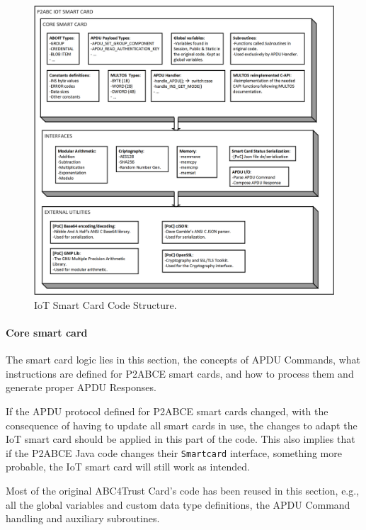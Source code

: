 \begin{figure}[bth]
	\begin{center}
		\includegraphics[width=\linewidth]{gfx/IoTCScomponents-bw}
	\end{center}
	\caption{IoT Smart Card Code Structure.}
	\label{fig:IoTCScomponents-bw}
\end{figure}


\hfil

\paragraph{Core smart card}
\hfil

The smart card logic lies in this section, the concepts of APDU Commands, what instructions are defined for P2ABCE smart cards, and how to process them and generate proper APDU Responses.

If the APDU protocol defined for P2ABCE smart cards changed, with the consequence of having to update all smart cards in use, the changes to adapt the IoT smart card should be applied in this part of the code. This also implies that if the P2ABCE Java code changes their \texttt{Smartcard} interface, something more probable, the IoT smart card will still work as intended.

Most of the original ABC4Trust Card's code has been reused in this section, e.g., all the global variables and custom data type definitions, the APDU Command handling and auxiliary subroutines.

